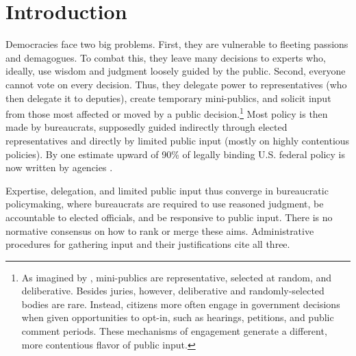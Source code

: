 
\section{Introduction}
Democracies face two big problems. First, they are vulnerable to fleeting passions and demagogues. To combat this, they leave many decisions to experts who, ideally, use wisdom and judgment loosely guided by the public. Second, everyone cannot vote on every decision. Thus, they delegate power to representatives (who then delegate it to deputies), create temporary mini-publics,
and solicit input from those most affected or moved by a public decision.\footnote{
As imagined by \citet{Dahl1989}, mini-publics are representative, selected at random, and deliberative. Besides juries, however, deliberative and randomly-selected bodies are rare. Instead, citizens more often engage in government decisions when given opportunities to opt-in, such as hearings, petitions, and public comment periods. These mechanisms of engagement generate a different, more contentious flavor of public input.
}
Most policy is then made by bureaucrats, supposedly guided indirectly through elected representatives and directly by limited public input (mostly on highly contentious policies).
By one estimate upward of 90\% of legally binding U.S. federal policy is now written by agencies \citep{West2013}.


Expertise, delegation, and limited public input thus converge in bureaucratic policymaking, where bureaucrats are required to use reasoned judgment, be accountable to elected officials, and be responsive to public input. There is no normative consensus on how to rank or merge these aims.
Administrative procedures for gathering input and their justifications cite all three.



